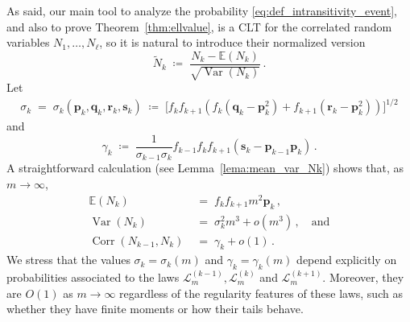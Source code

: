 \documentclass[reqno,a4paper,11pt]{amsart}
\theoremstyle{remark}
\newcommand{\mc}[1]{{\mathcal #1}}
\newcommand{\mb}[1]{{\mathbf #1}}
\newcommand{\bb}[1]{{\mathbb #1}}
\newcommand{\wt}[1]{{\widetilde{#1}}}
\numberwithin{equation}{section}
\newcommand{\var}[1]{\operatorname{Var}\left(#1\right)}
\newcommand{\corr}[1]{\operatorname{Corr}\left(#1\right)}
\begin{document}
As said, our main tool to analyze the probability \eqref{eq:def_intransitivity_event}, and also to prove Theorem~\ref{thm:ellvalue}, is a CLT for the correlated random variables $N_1,\hdots,N_\ell$, so it is natural to introduce their normalized version
\begin{equation}
\label{eq:def_tilde_Nk}
\wt N_k \;\coloneqq\; \frac{N_k - \bb E(N_k)}{\sqrt{\var{N_k}}}\,.
\end{equation}
Let
\begin{align}
\sigma_k
    \;=\;\sigma_k(\mb p_k,\mb q_k,\mb r_k,\mb s_k)
\;\coloneqq\; \Big[f_k f_{k+1}
    \left(f_k(\mb q_k - \mb p_k^2) + f_{k+1}(\mb r_k - \mb p_k^2)\right)
    \Big]^{1/2}\label{eq:def_sigma_k}
\end{align}
%
and
%
\begin{equation}
\label{eq:def_gamma_k}
\gamma_k\;\coloneqq\; \frac{1}{\sigma_{k-1}\sigma_k}f_{k-1}f_kf_{k+1}(\mb s_k-\mb p_{k-1}\mb p_k)\,.
\end{equation}
A straightforward calculation (see Lemma~\ref{lema:mean_var_Nk}) shows that, as $m\to \infty$,
%
\begin{equation}\label{eq:ENkvarNk}
\begin{split}
\bb E (N_k)& \;=\; f_kf_{k+1}m^2\mb p_k\,,  \\
\var{N_k} & \;=\; \sigma_k^2 m^3+o(m^{3})\,,\quad \text{and} \\
\corr{N_{k-1},N_{k}}& \;=\; \gamma_k +o(1)\,.
\end{split}
\end{equation}
We stress that the values $\sigma_k=\sigma_k(m)$ and $\gamma_k=\gamma_k(m)$ depend explicitly on probabilities associated to the laws $\mc L^{(k-1)}_m,\mc L^{(k)}_m$ and $\mc L^{(k+1)}_m$. Moreover, they are $O(1)$ as $m\to \infty$ regardless of the regularity features of these laws, such as whether they have finite moments or how their tails behave.
\end{document}
